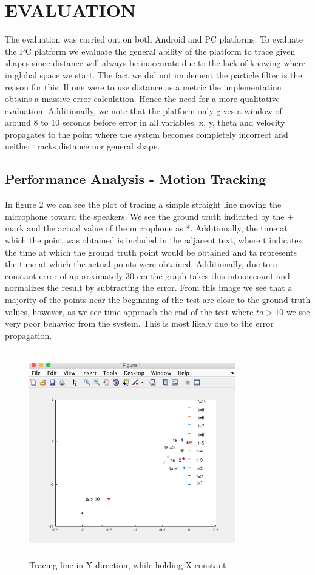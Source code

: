 \documentclass{acm_proc_article-sp}
\begin{document}
\section{EVALUATION} \label{evaluation}
The evaluation was carried out on both Android and PC platforms. To evaluate the PC platform we evaluate the general ability of the platform to trace given shapes since distance will always be inaccurate due to the lack of knowing where in global space we start. The fact we did not implement the particle filter is the reason for this. If one were to use distance as a metric the implementation obtains a massive error calculation. Hence the need for a more qualitative evaluation. Additionally, we note that the platform only gives a window of around 8 to 10 seconds before error in all variables, x, y, theta and velocity propagates to the point where the system becomes completely incorrect and neither tracks distance nor general shape.

\subsection{Performance Analysis - Motion Tracking}
In figure 2 we can see the plot of tracing a simple straight line moving the microphone toward the speakers. We see the ground truth indicated by the + mark and the actual value of the microphone as *. Additionally, the time at which the point was obtained is included in the adjacent text, where t indicates the time at which the ground truth point would be obtained and ta represents the time at which the actual points were obtained. Additionally, due to a constant error of approximately 30 cm the graph takes this into account and normalizes the result by subtracting the error. From this image we see that a majority of the points near the beginning of the test are close to the ground truth values, however, as we see time approach the end of the test where $ta > 10$ we see very poor behavior from the system. This is most likely due to the error propagation.

\begin{figure}[h]
\caption{Tracing line in Y direction, while holding X constant}
\includegraphics[width=9cm, height=9cm]{TracingY}
\end{figure}
\end{document}
